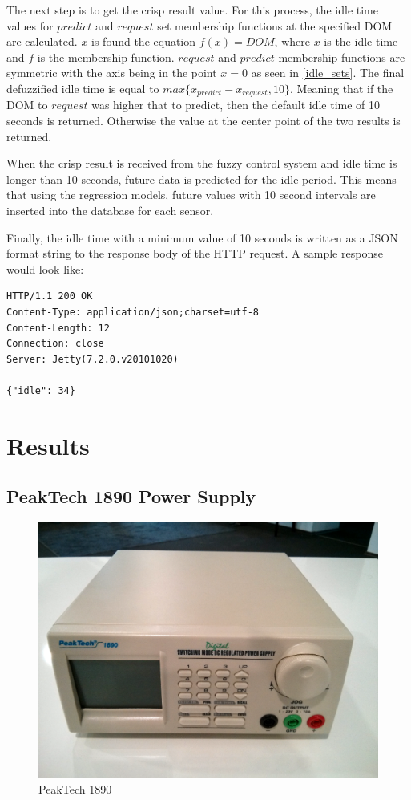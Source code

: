 The next step is to get the crisp result value. For this process, the idle time values for $predict$ and $request$ set membership functions at the specified DOM are calculated. $x$ is found the equation $f(x) = DOM$, where $x$ is the idle time and $f$ is the membership function. $request$ and $predict$ membership functions are symmetric with the axis being in the point $x = 0$ as seen in \autoref{idle_sets}. The final defuzzified idle time is equal to $max\{x_{predict} - x_{request}, 10\}$. Meaning that if the DOM to $request$ was higher that to predict, then the default idle time of 10 seconds is returned. Otherwise the value at the center point of the two results is returned.

When the crisp result is received from the fuzzy control system and idle time is longer than 10 seconds, future data is predicted for the idle period. This means that using the regression models, future values with 10 second intervals are inserted into the database for each sensor. 

Finally, the idle time with a minimum value of 10 seconds is written as a JSON format string to the response body of the HTTP request. A sample response would look like:

\begin{lstlisting}
HTTP/1.1 200 OK
Content-Type: application/json;charset=utf-8
Content-Length: 12
Connection: close
Server: Jetty(7.2.0.v20101020)

{"idle": 34}
\end{lstlisting}

\section{Results}

\subsection{PeakTech 1890 Power Supply}

\begin{figure}[h]
\centering
\includegraphics[scale=0.48]{4/figures/peaktech.pdf}
\caption{PeakTech 1890}
\label{peaktech}
\end{figure}

